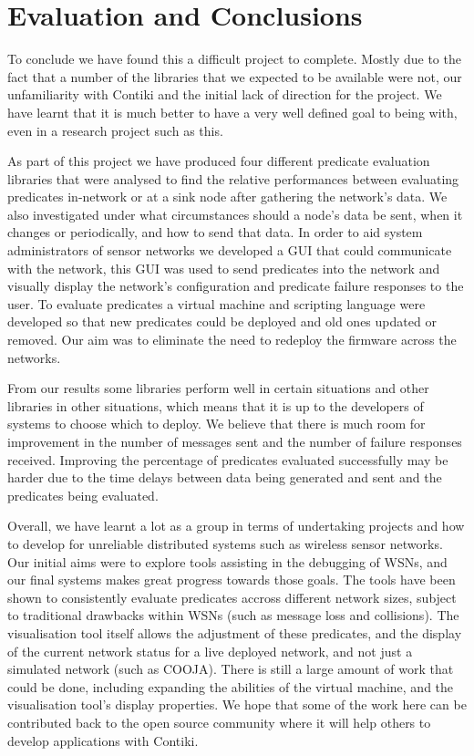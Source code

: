 \section{Evaluation and Conclusions}

To conclude we have found this a difficult project to complete. Mostly due to the fact that a number of the libraries that we expected to be available were not, our unfamiliarity with Contiki and the initial lack of direction for the project. We have learnt that it is much better to have a very well defined goal to being with, even in a research project such as this.

As part of this project we have produced four different predicate evaluation libraries that were analysed to find the relative performances between evaluating predicates in-network or at a sink node after gathering the network's data. We also investigated under what circumstances should a node's data be sent, when it changes or periodically, and how to send that data. In order to aid system administrators of sensor networks we developed a GUI that could communicate with the network, this GUI was used to send predicates into the network and visually display the network's configuration and predicate failure responses to the user. To evaluate predicates a virtual machine and scripting language were developed so that new predicates could be deployed and old ones updated or removed. Our aim was to eliminate the need to redeploy the firmware across the networks.

From our results some libraries perform well in certain situations and other libraries in other situations, which means that it is up to the developers of systems to choose which to deploy. We believe that there is much room for improvement in the number of messages sent and the number of failure responses received. Improving the percentage of predicates evaluated successfully may be harder due to the time delays between data being generated and sent and the predicates being evaluated.


Overall, we have learnt a lot as a group in terms of undertaking projects and how to develop for unreliable distributed systems such as wireless sensor networks. Our initial aims were to explore tools assisting in the debugging of WSNs, and our final systems makes great progress towards those goals. The tools have been shown to consistently evaluate predicates accross different network sizes, subject to traditional drawbacks within WSNs (such as message loss and collisions). The visualisation tool itself allows the adjustment of these predicates, and the display of the current network status for a live deployed network, and not just a simulated network (such as COOJA). There is still a large amount of work that could be done, including expanding the abilities of the virtual machine, and the visualisation tool's display properties. We hope that some of the work here can be contributed back to the open source community where it will help others to develop applications with Contiki.


